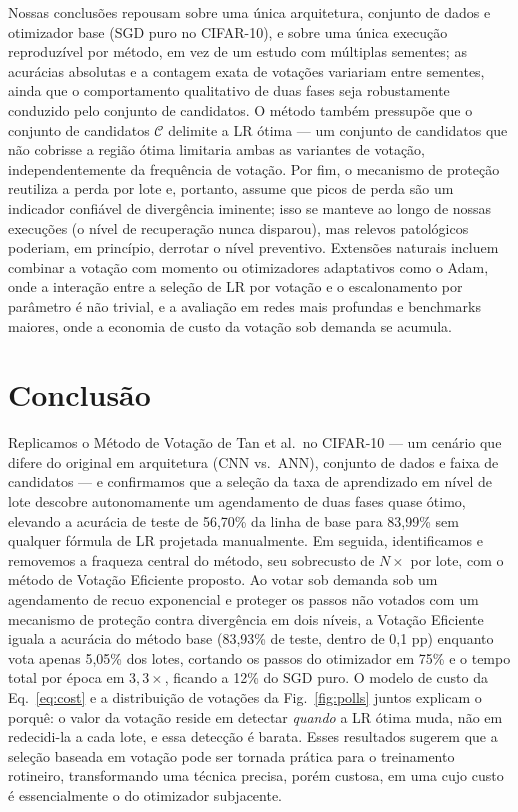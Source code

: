 \documentclass[conference]{IEEEtran}
\begin{document}
Nossas conclusões repousam sobre uma única arquitetura, conjunto de dados e otimizador base (SGD puro no CIFAR-10), e sobre uma única execução reproduzível por método, em vez de um estudo com múltiplas sementes; as acurácias absolutas e a contagem exata de votações variariam entre sementes, ainda que o comportamento qualitativo de duas fases seja robustamente conduzido pelo conjunto de candidatos. O método também pressupõe que o conjunto de candidatos $\mathcal{C}$ delimite a LR ótima --- um conjunto de candidatos que não cobrisse a região ótima limitaria ambas as variantes de votação, independentemente da frequência de votação. Por fim, o mecanismo de proteção reutiliza a perda por lote e, portanto, assume que picos de perda são um indicador confiável de divergência iminente; isso se manteve ao longo de nossas execuções (o nível de recuperação nunca disparou), mas relevos patológicos poderiam, em princípio, derrotar o nível preventivo. Extensões naturais incluem combinar a votação com momento ou otimizadores adaptativos como o Adam, onde a interação entre a seleção de LR por votação e o escalonamento por parâmetro é não trivial, e a avaliação em redes mais profundas e benchmarks maiores, onde a economia de custo da votação sob demanda se acumula.

\section{Conclusão}

Replicamos o Método de Votação de Tan et al.\ no CIFAR-10 --- um cenário que difere do original em arquitetura (CNN vs.\ ANN), conjunto de dados e faixa de candidatos --- e confirmamos que a seleção da taxa de aprendizado em nível de lote descobre autonomamente um agendamento de duas fases quase ótimo, elevando a acurácia de teste de 56,70\% da linha de base para 83,99\% sem qualquer fórmula de LR projetada manualmente. Em seguida, identificamos e removemos a fraqueza central do método, seu sobrecusto de $N\times$ por lote, com o método de Votação Eficiente proposto. Ao votar sob demanda sob um agendamento de recuo exponencial e proteger os passos não votados com um mecanismo de proteção contra divergência em dois níveis, a Votação Eficiente iguala a acurácia do método base (83,93\% de teste, dentro de 0,1 pp) enquanto vota apenas 5,05\% dos lotes, cortando os passos do otimizador em 75\% e o tempo total por época em $3,3\times$, ficando a 12\% do SGD puro. O modelo de custo da Eq.~\eqref{eq:cost} e a distribuição de votações da Fig.~\ref{fig:polls} juntos explicam o porquê: o valor da votação reside em detectar \emph{quando} a LR ótima muda, não em redecidi-la a cada lote, e essa detecção é barata. Esses resultados sugerem que a seleção baseada em votação pode ser tornada prática para o treinamento rotineiro, transformando uma técnica precisa, porém custosa, em uma cujo custo é essencialmente o do otimizador subjacente.
\end{document}
